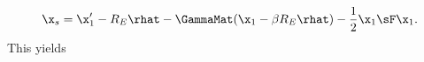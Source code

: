 \begin{equation}
\x_s = \x'_1 - R_E \rhat - \GammaMat(\x_1 - \beta R_E \rhat) - \frac{1}{2} \x_1 \sF \x_1.
\end{equation}
This yields
  
  
  